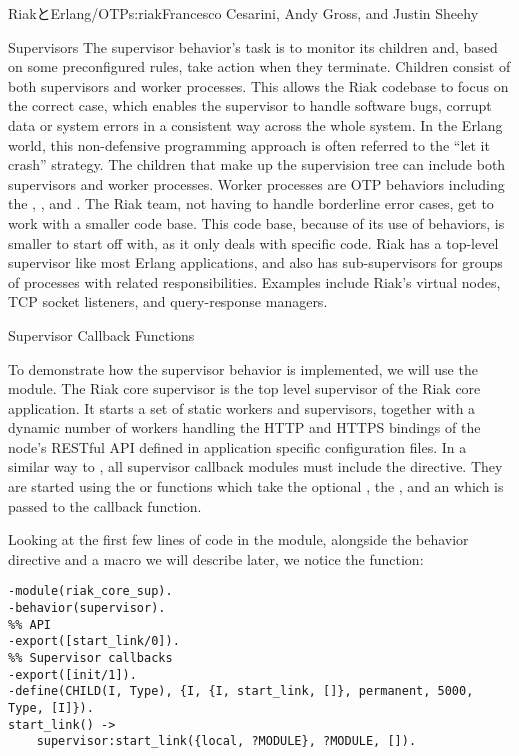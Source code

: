 \begin{aosachapter}{RiakとErlang/OTP}{s:riak}{Francesco Cesarini, Andy Gross, and Justin Sheehy}
\begin{aosasect1}{Supervisors}
The supervisor behavior's task is to monitor its children and, based
on some preconfigured rules, take action when they terminate. Children
consist of both supervisors and worker processes. This allows the Riak
codebase to focus on the correct case, which enables the supervisor to
handle software bugs, corrupt data or system errors in a consistent
way across the whole system. In the Erlang world, this non-defensive
programming approach is often referred to the ``let it crash''
strategy. The children that make up the supervision tree can include
both supervisors and worker processes. Worker processes are OTP
behaviors including the , , and
. The Riak team, not having to handle borderline
error cases, get to work with a smaller code base. This code base,
because of its use of behaviors, is smaller to start off with, as it
only deals with specific code. Riak has a top-level supervisor like
most Erlang applications, and also has sub-supervisors for groups
of processes with related responsibilities.  Examples include Riak's
virtual nodes, TCP socket listeners, and query-response managers.

\begin{aosasect2}{Supervisor Callback Functions}

To demonstrate how the supervisor behavior is implemented, we will use
the  module. The Riak core supervisor is the
top level supervisor of the Riak core application. It starts a set of
static workers and supervisors, together with a dynamic number of
workers handling the HTTP and HTTPS bindings of the node's RESTful API
defined in application specific configuration files. In a similar way
to , all supervisor callback modules must include
the  directive. They are started using
the  or  functions which take the
optional , the , and an
 which is passed to the  callback
function.

Looking at the first few lines of code in the
 module, alongside the behavior directive
and a macro we will describe later, we notice the 
function:

\begin{verbatim}
-module(riak_core_sup).
-behavior(supervisor).
%% API
-export([start_link/0]).
%% Supervisor callbacks
-export([init/1]).
-define(CHILD(I, Type), {I, {I, start_link, []}, permanent, 5000, Type, [I]}).
start_link() ->
    supervisor:start_link({local, ?MODULE}, ?MODULE, []).
\end{verbatim}


\end{aosasect2}
\end{aosasect1}
\end{aosachapter}
